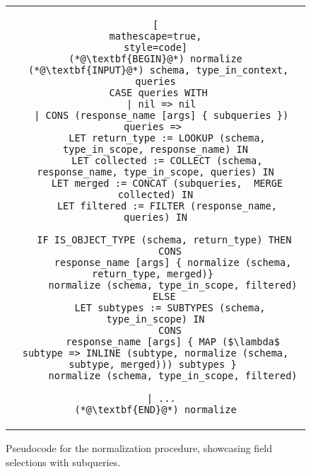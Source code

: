 \begin{figure*}[h]
\centering
\begin{tabular}{c}
\begin{lstlisting}[
mathescape=true,
style=code]
(*@\textbf{BEGIN}@*) normalize
 (*@\textbf{INPUT}@*) schema, type_in_context, queries
 CASE queries WITH
  | nil => nil
  | CONS (response_name [args] { subqueries }) queries => 
    LET return_type := LOOKUP (schema, type_in_scope, response_name) IN
    LET collected := COLLECT (schema, response_name, type_in_scope, queries) IN
    LET merged := CONCAT (subqueries,  MERGE collected) IN
    LET filtered := FILTER (response_name, queries) IN
    
    IF IS_OBJECT_TYPE (schema, return_type) THEN 
     CONS
      response_name [args] { normalize (schema, return_type, merged)} 
      normalize (schema, type_in_scope, filtered)
    ELSE 
     LET subtypes := SUBTYPES (schema, type_in_scope) IN
     CONS
      response_name [args] { MAP ($\lambda$ subtype => INLINE (subtype, normalize (schema, subtype, merged))) subtypes } 
      normalize (schema, type_in_scope, filtered)
     
  | ...
(*@\textbf{END}@*) normalize
\end{lstlisting}
\end{tabular}
\caption{Pseudocode for the normalization procedure, showcasing field selections with subqueries.}
\label{fig:normalize}
\end{figure*}

